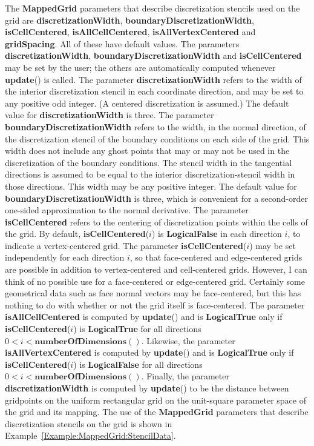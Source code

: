 \documentclass{article}
\begin{document}
The \textbf{MappedGrid} parameters that describe discretization stencils used on the grid are \textbf{discretizationWidth},
\textbf{boundaryDiscretizationWidth}, \textbf{isCellCentered}, \textbf{isAllCellCentered}, \textbf{isAllVertexCentered}
and \textbf{gridSpacing}.  All of these have default values.  The parameters \textbf{discretizationWidth},
\textbf{boundaryDiscretizationWidth} and \textbf{isCellCentered} may be set by the user; the others are automatically
computed whenever \textbf{update}() is called.  The parameter \textbf{discretizationWidth} refers to the width of the interior
discretization stencil in each coordinate direction, and may be set to any positive odd integer.  (A centered discretization is
assumed.)  The default value for \textbf{discretizationWidth} is three.  The parameter \textbf{boundaryDiscretizationWidth}
refers to the width, in the normal direction, of the discretization stencil of the boundary conditions on each side of the grid.
This width does not include any ghost points that may or may not be used in the discretization of the boundary conditions.  The
stencil width in the tangential directions is assumed to be equal to the interior discretization-stencil width in those directions.
This width may be any positive integer.  The default value for \textbf{boundaryDiscretizationWidth} is three, which is convenient
for a second-order one-sided approximation to the normal derivative.  The parameter \textbf{isCellCentered} refers to the
centering of discretization points within the cells of the grid.  By default, \textbf{isCellCentered}($i$) is \textbf{LogicalFalse}
in each direction $i$, to indicate a vertex-centered grid.  The parameter \textbf{isCellCentered}($i$) may be set
independently for each direction $i$, so that face-centered and edge-centered grids are possible in addition to vertex-centered and
cell-centered grids.  However, I can think of no possible use for a face-centered or edge-centered grid.  Certainly some geometrical
data such as face normal vectors may be face-centered, but this has nothing to do with whether or not the grid itself is face-centered.
The parameter \textbf{isAllCellCentered} is computed by \textbf{update}() and is \textbf{LogicalTrue} only if
\textbf{isCellCentered}($i$) is \textbf{LogicalTrue} for all directions $0 < i < \textbf{numberOfDimensions}()$.
Likewise, the parameter \textbf{isAllVertexCentered} is computed by \textbf{update}() and is \textbf{LogicalTrue}
only if \textbf{isCellCentered}($i$) is \textbf{LogicalFalse} for all directions $0 < i < \textbf{numberOfDimensions}()$.
Finally, the parameter \textbf{discretizationWidth} is computed by \textbf{update}() to be the distance between gridpoints on the
uniform rectangular grid on the unit-square parameter space of the grid and its mapping.  The use of the \textbf{MappedGrid} parameters
that describe discretization stencils on the grid is shown in Example~\ref{Example:MappedGrid:StencilData}.
\end{document}
